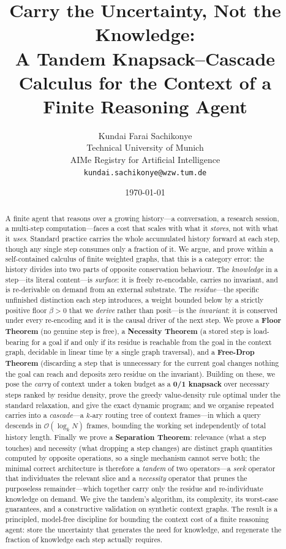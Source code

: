 \documentclass[11pt,a4paper]{article}
\title{\textbf{Carry the Uncertainty, Not the Knowledge:\\[3pt]
A Tandem Knapsack--Cascade Calculus for the Context of a\\
Finite Reasoning Agent}}
\author{%
Kundai Farai Sachikonye\\
\small Technical University of Munich\\
\small AIMe Registry for Artificial Intelligence\\
\small \texttt{kundai.sachikonye@wzw.tum.de}}
\date{\today}
\theoremstyle{thmstyle}
\theoremstyle{definition}
\theoremstyle{remark}
\newcommand{\flo}{\beta}                %
\begin{document}
\maketitle

\begin{abstract}
\noindent
A finite agent that reasons over a growing history---a conversation, a
research session, a multi-step computation---faces a cost that scales with
what it \emph{stores}, not with what it \emph{uses}. Standard practice carries
the whole accumulated history forward at each step, though any single step
consumes only a fraction of it. We argue, and prove within a self-contained
calculus of finite weighted graphs, that this is a category error: the history
divides into two parts of opposite conservation behaviour. The
\emph{knowledge} in a step---its literal content---is \emph{surface}: it is
freely re-encodable, carries no invariant, and is re-derivable on demand from
an external substrate. The \emph{residue}---the specific unfinished distinction
each step introduces, a weight bounded below by a strictly positive floor
$\flo>0$ that we \emph{derive} rather than posit---is the \emph{invariant}: it
is conserved under every re-encoding and it is the causal driver of the next
step. We prove a \textbf{Floor Theorem} (no genuine step is free), a
\textbf{Necessity Theorem} (a stored step is load-bearing for a goal if and
only if its residue is reachable from the goal in the context graph, decidable
in linear time by a single graph traversal), and a \textbf{Free-Drop Theorem}
(discarding a step that is unnecessary for the current goal changes nothing the
goal can reach and deposits zero residue on the invariant). Building on these,
we pose the \emph{carry} of context under a token budget as a \textbf{0/1
knapsack} over necessary steps ranked by residue density, prove the greedy
value-density rule optimal under the standard relaxation, and give the exact
dynamic program; and we organise repeated carries into a \emph{cascade}---a
$k$-ary routing tree of context frames---in which a query descends in
$\mathcal{O}(\log_k N)$ frames, bounding the working set independently of total
history length. Finally we prove a \textbf{Separation Theorem}: relevance
(what a step touches) and necessity (what dropping a step changes) are distinct
graph quantities computed by opposite operations, so a single mechanism cannot
serve both; the minimal correct architecture is therefore a \emph{tandem} of
two operators---a \emph{seek} operator that individuates the relevant slice and
a \emph{necessity} operator that prunes the purposeless remainder---which
together carry only the residue and re-individuate knowledge on demand. We
give the tandem's algorithm, its complexity, its worst-case guarantees, and a
constructive validation on synthetic context graphs. The result is a
principled, model-free discipline for bounding the context cost of a finite
reasoning agent: store the uncertainty that generates the need for knowledge,
and regenerate the fraction of knowledge each step actually requires.
\end{abstract}
\end{document}
